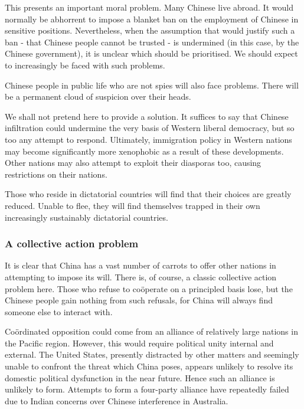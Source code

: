 	This presents an important moral problem. Many Chinese live abroad. It
	would normally be abhorrent to impose a blanket ban on the employment of
	Chinese in sensitive positions. Nevertheless, when the assumption that
	would justify such a ban - that Chinese people cannot be trusted - is
	undermined (in this case, by the Chinese government), it is unclear
	which should be prioritised. We should expect to increasingly be faced
	with such problems.

	Chinese people in public life who are not spies will also face problems.
	There will be a permanent cloud of suspicion over their heads.

	We shall not pretend here to provide a solution. It suffices to say that
	Chinese infiltration could undermine the very basis of Western liberal
	democracy, but so too any attempt to respond. Ultimately, immigration
	policy in Western nations may become significantly more xenophobic as
	a result of these developments. Other nations may also attempt to exploit
	their diasporas too, causing restrictions on their nations.

	Those who reside in dictatorial countries will find that their choices
	are greatly reduced. Unable to flee, they will find themselves trapped in
	their own increasingly sustainably dictatorial countries.


\subsubsection{A collective action
	problem}\label{a-collective-action-problem}


	It is clear that China has a vast number of carrots to offer other
	nations in attempting to impose its will. There is, of course, a classic
	collective action problem here. Those who refuse to coöperate on a
	principled basis lose, but the Chinese people gain nothing from such
	refusals, for China will always find someone else to interact with.

	Coördinated opposition could come from an alliance of relatively large nations in the Pacific region. However, this would require political unity internal and external. The United States, presently distracted by other matters and seemingly unable to confront the threat which China poses, appears unlikely to resolve its domestic political dysfunction in the near future. Hence such an alliance is unlikely to form. Attempts to form a four-party alliance have repeatedly failed due to Indian concerns over Chinese interference in Australia.


